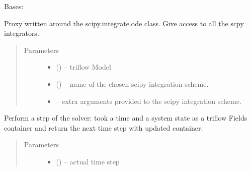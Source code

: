 \documentclass[letterpaper,10pt,english]{sphinxmanual}
\begin{document}

\begin{fulllineitems}
\label{\detokenize{triflow.plugins:triflow.plugins.schemes.scipy_ode}}
Bases: 

Proxy written around the scipy.integrate.ode class. Give access to all
the scpy integrators.
\begin{quote}\begin{description}
\item[{Parameters}] \leavevmode\begin{itemize}
\item {} 
 () -- triflow Model

\item {} 
 (\sphinxstyleliteralemphasis{, }\sphinxstyleliteralemphasis{, }) -- name of the chosen scipy integration scheme.

\item {} 
 -- extra arguments provided to the scipy integration scheme.

\end{itemize}

\end{description}\end{quote}

\begin{fulllineitems}
\label{\detokenize{triflow.plugins:triflow.plugins.schemes.scipy_ode.__call__}}
Perform a step of the solver: took a time and a system state as a
triflow Fields container and return the next time step with updated
container.
\begin{quote}\begin{description}
\item[{Parameters}] \leavevmode\begin{itemize}
\item {} 
 () -- actual time step


\end{itemize}
\end{description}
\end{quote}
\end{fulllineitems}
\end{fulllineitems}
\end{document}
